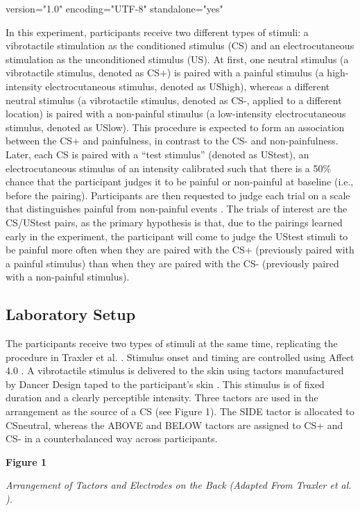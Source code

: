 version="1.0" encoding="UTF-8" standalone="yes" \documentclass{article}
\begin{document}
In this experiment, participants receive two different types of stimuli: a vibrotactile stimulation as the conditioned stimulus (CS) and an electrocutaneous stimulation as the unconditioned stimulus (US). At first, one neutral stimulus (a vibrotactile stimulus, denoted as CS+) is paired with a painful stimulus (a high-intensity electrocutaneous stimulus, denoted as UShigh), whereas a different neutral stimulus (a vibrotactile stimulus, denoted as CS-, applied to a different location) is paired with a non-painful stimulus (a low-intensity electrocutaneous stimulus, denoted as USlow). This procedure is expected to form an association between the CS+ and painfulness, in contrast to the CS- and non-painfulness. Later, each CS is paired with a “test stimulus” (denoted as UStest), an electrocutaneous stimulus of an intensity calibrated such that there is a 50\% chance that the participant judges it to be painful or non-painful at baseline (i.e., before the pairing). Participants are then requested to judge each trial on a scale that distinguishes painful from non-painful events \autocite{bib(Maddenetal.2019)}. The trials of interest are the CS/UStest pairs, as the primary hypothesis is that, due to the pairings learned early in the experiment, the participant will come to judge the UStest stimuli to be painful more often when they are paired with the CS+ (previously paired with a painful stimulus) than when they are paired with the CS- (previously paired with a non-painful stimulus).

\subsection{Laboratory Setup}

The participants receive two types of stimuli at the same time, replicating the procedure in Traxler et al. \autocite{bib(2019)}. Stimulus onset and timing are controlled using Affect 4.0 \autocite{bib(Spruytetal.2009)}. A vibrotactile stimulus is delivered to the skin using tactors manufactured by Dancer Design taped to the participant's skin \autocite{bib(DancerDesignn.d.)}. This stimulus is of fixed duration and a clearly perceptible intensity. Three tactors are used in the arrangement as the source of a CS (see Figure 1). The SIDE tactor is allocated to CSneutral, whereas the ABOVE and BELOW tactors are assigned to CS+ and CS- in a counterbalanced way across participants.

\textbf{Figure 1}

\emph{Arrangement of Tactors and Electrodes on the Back}\emph{ }\emph{(Adapted From Traxler et al. }\autocite{bib(2019)}\emph{)}\emph{.}
\end{document}
